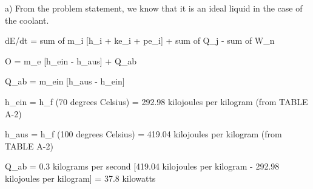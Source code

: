 a) From the problem statement, we know that it is an ideal liquid in the case of the coolant.

dE/dt = sum of m_i [h_i + ke_i + pe_i] + sum of Q_j - sum of W_n

O = m_e [h_ein - h_aus] + Q_ab

Q_ab = m_ein [h_aus - h_ein]

h_ein = h_f (70 degrees Celsius) = 292.98 kilojoules per kilogram (from TABLE A-2)

h_aus = h_f (100 degrees Celsius) = 419.04 kilojoules per kilogram (from TABLE A-2)

Q_ab = 0.3 kilograms per second [419.04 kilojoules per kilogram - 292.98 kilojoules per kilogram] = 37.8 kilowatts